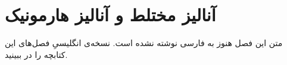 \chapter{آنالیز مختلط و آنالیز هارمونیک}
\label{ch:08-complex-analysis-and-harmonic-analysis-fa-01}

متن این فصل هنوز به فارسی نوشته نشده است. نسخه‌ی انگلیسیِ فصل‌های این کتابچه را در  ببینید.
